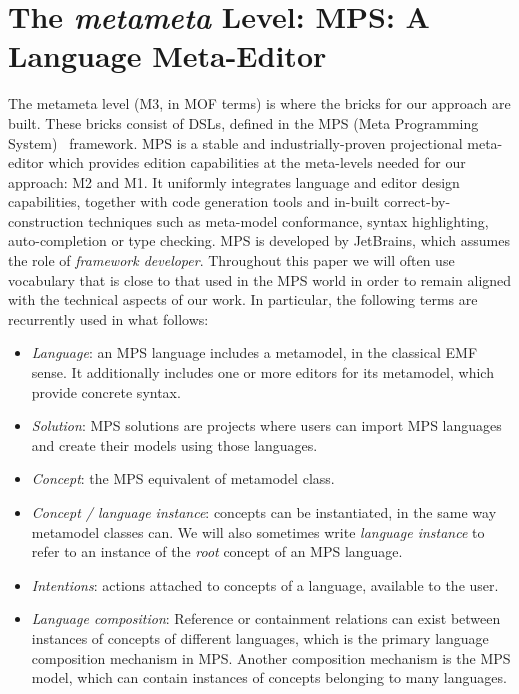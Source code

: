 \section{The \emph{metameta} Level: MPS: A Language Meta-Editor}
\label{sec:metameta}
\vspace{-.3cm}
The metameta level (M3, in MOF terms) is where the bricks for our approach are
built. These bricks consist of DSLs, defined in the MPS (Meta Programming
System)~\cite{mps} framework. MPS is a stable and industrially-proven
projectional meta-editor which provides edition capabilities at the meta-levels
needed for our approach: M2 and M1. It uniformly integrates language and editor
design capabilities, together with code generation tools and in-built
correct-by-construction techniques such as meta-model conformance, syntax
highlighting, auto-completion or type checking.
MPS is developed by JetBrains, which assumes the role of \emph{framework
developer}.
Throughout this paper we will often use vocabulary that is close to that used in
the MPS world in order to remain aligned with the technical aspects of our
work. In particular, the following terms are recurrently used in what follows:
\vspace{-.3cm}
\begin{itemize}
  \item \emph{Language}: an MPS language includes a metamodel, in the classical
  EMF sense. It additionally includes one or more editors for its metamodel,
  which provide concrete syntax.
  \item \emph{Solution}: MPS solutions are projects where users can import
  MPS languages and create their models using those languages.
  \item \emph{Concept}: the MPS equivalent of metamodel class.
  \item \emph{Concept / language instance}: concepts can be instantiated, in
  the same way metamodel classes can. We will also sometimes write
  \emph{language instance} to refer to an instance of the \emph{root} concept of
  an MPS language.
  \item \emph{Intentions}: actions attached to
  concepts of a language, available to the user. 
  \item \emph{Language composition}:  Reference or containment relations can exist between instances of
  concepts of different languages, which is the primary language composition
  mechanism in MPS.
 Another composition mechanism is the MPS model, which can contain instances of
 concepts belonging to many languages.
\end{itemize}
\vspace{-.5cm}

